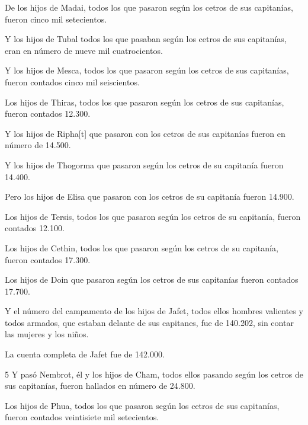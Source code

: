 \par De los hijos de Madai, todos los que pasaron según los cetros de sus capitanías, fueron cinco mil setecientos.

\par Y los hijos de Tubal todos los que pasaban según los cetros de sus capitanías, eran en número de nueve mil cuatrocientos.

\par Y los hijos de Mesca, todos los que pasaron según los cetros de sus capitanías, fueron contados cinco mil seiscientos.

\par Los hijos de Thiras, todos los que pasaron según los cetros de sus capitanías, fueron contados 12.300.

\par Y los hijos de Ripha[t] que pasaron con los cetros de sus capitanías fueron en número de 14.500.

\par Y los hijos de Thogorma que pasaron según los cetros de su capitanía fueron 14.400.

\par Pero los hijos de Elisa que pasaron con los cetros de su capitanía fueron 14.900.

\par Los hijos de Tersis, todos los que pasaron según los cetros de su capitanía, fueron contados 12.100.

\par Los hijos de Cethin, todos los que pasaron según los cetros de su capitanía, fueron contados 17.300.

\par Los hijos de Doin que pasaron según los cetros de sus capitanías fueron contados 17.700.

\par Y el número del campamento de los hijos de Jafet, todos ellos hombres valientes y todos armados, que estaban delante de sus capitanes, fue de 140.202, sin contar las mujeres y los niños.

\par La cuenta completa de Jafet fue de 142.000.

\par 5 Y pasó Nembrot, él y los hijos de Cham, todos ellos pasando según los cetros de sus capitanías, fueron hallados en número de 24.800.

\par Los hijos de Phua, todos los que pasaron según los cetros de sus capitanías, fueron contados veintisiete mil setecientos.

